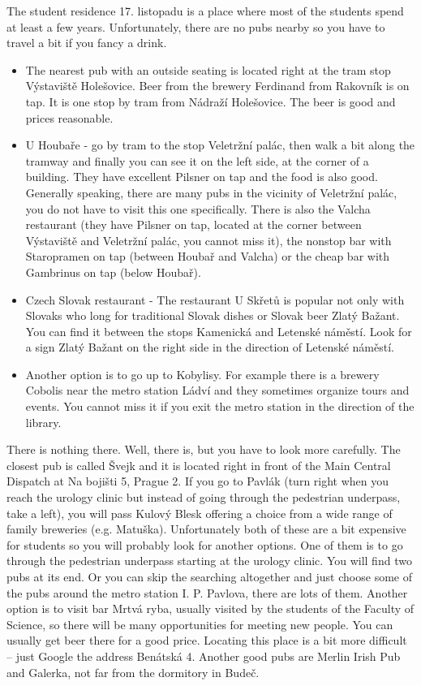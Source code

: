 The student residence 17. listopadu is a place where most of the students spend
at least a few years. Unfortunately, there are no pubs nearby so you have to
travel a bit if you fancy a drink.
\begin{itemize}
\item The nearest pub with an outside seating is located right at the tram stop
Výstaviště Holešovice. Beer from the brewery Ferdinand from Rakovník is on tap.
It is one stop by tram from Nádraží Holešovice. The beer is good and prices
reasonable.
\item U Houbaře - go by tram to the stop Veletržní palác, then walk a bit along
the tramway and finally you can see it on the left side, at the corner of a
building. They have excellent Pilsner on tap and the food is also good.
Generally speaking, there are many pubs in the vicinity of Veletržní palác, you
do not have to visit this one specifically. There is also the Valcha restaurant
(they have Pilsner on tap, located at the corner between Výstaviště and
Veletržní palác, you cannot miss it), the nonstop bar with Staropramen on tap
(between Houbař and Valcha) or the cheap bar with Gambrinus on tap (below
Houbař).
\item Czech Slovak restaurant - The restaurant U Skřetů is popular not only with
Slovaks who long for traditional Slovak dishes or Slovak beer Zlatý Bažant. You
can find it between the stops Kamenická and Letenské náměstí.
Look for a sign Zlatý Bažant on the right side in the direction of Letenské
náměstí.
\item Another option is to go up to Kobylisy. For example there is a brewery
Cobolis near the metro station Ládví and they sometimes organize tours and
events. You cannot miss it if you exit the metro station in the direction of the
library.
\end{itemize}

There is nothing there. Well, there is, but you have to look more carefully.
The closest pub is called Švejk and it is located right in front of the Main
Central Dispatch at Na bojišti 5, Prague 2. If you go to Pavlák (turn right when
you reach the urology clinic but instead of going through the pedestrian
underpass, take a left), you will pass Kulový Blesk offering a choice from a
wide range of family breweries (e.g. Matuška). Unfortunately both of these are a
bit expensive for students so you will probably look for another options.
One of them is to go through the pedestrian underpass starting at the urology
clinic. You will find two pubs at its end.
Or you can skip the searching altogether and just choose some of the pubs around
the metro station I. P. Pavlova, there are lots of them.
Another option is to visit bar Mrtvá ryba, usually visited by the students of
the Faculty of Science, so there will be many opportunities for meeting new
people. You can usually get beer  there for a good price.
Locating this place is a bit more difficult -- just Google the address Benátská
4.
Another good pubs are Merlin Irish Pub and Galerka, not far from the dormitory
in Budeč.

